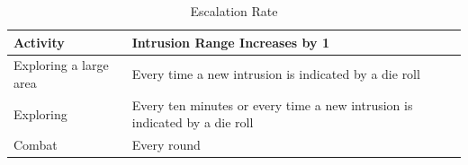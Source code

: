 \begin{table}[h]

\centering
\caption{Escalation Rate}
\label{lab:Escalation Rate}

\begin{tabularx}{\textwidth}{| Y | Y |}
\hline

\textbf{Activity} & \textbf{Intrusion Range Increases by 1} \\ \hline

Exploring a large area & Every time a new intrusion is indicated by a die roll \\ \hline
Exploring & Every ten minutes or every time a new intrusion is indicated by a die roll \\ \hline
Combat & Every round \\ \hline

\end{tabularx}
\end{table}

